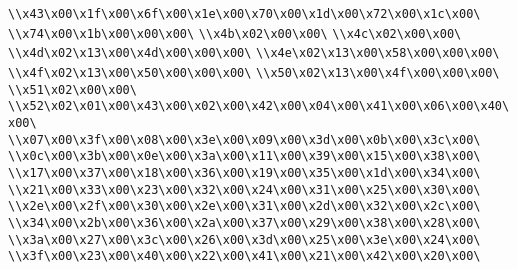 \verb|\\x43\x00\x1f\x00\x6f\x00\x1e\x00\x70\x00\x1d\x00\x72\x00\x1c\x00\|\newline
\verb|\\x74\x00\x1b\x00\x00\x00\|\newline
\verb|\\x4b\x02\x00\x00\|\newline
\verb|\\x4c\x02\x00\x00\|\newline
\verb|\\x4d\x02\x13\x00\x4d\x00\x00\x00\|\newline
\verb|\\x4e\x02\x13\x00\x58\x00\x00\x00\|\newline
\verb|\\x4f\x02\x13\x00\x50\x00\x00\x00\|\newline
\verb|\\x50\x02\x13\x00\x4f\x00\x00\x00\|\newline
\verb|\\x51\x02\x00\x00\|\newline
\verb|\\x52\x02\x01\x00\x43\x00\x02\x00\x42\x00\x04\x00\x41\x00\x06\x00\x40\x00\|\newline
\verb|\\x07\x00\x3f\x00\x08\x00\x3e\x00\x09\x00\x3d\x00\x0b\x00\x3c\x00\|\newline
\verb|\\x0c\x00\x3b\x00\x0e\x00\x3a\x00\x11\x00\x39\x00\x15\x00\x38\x00\|\newline
\verb|\\x17\x00\x37\x00\x18\x00\x36\x00\x19\x00\x35\x00\x1d\x00\x34\x00\|\newline
\verb|\\x21\x00\x33\x00\x23\x00\x32\x00\x24\x00\x31\x00\x25\x00\x30\x00\|\newline
\verb|\\x2e\x00\x2f\x00\x30\x00\x2e\x00\x31\x00\x2d\x00\x32\x00\x2c\x00\|\newline
\verb|\\x34\x00\x2b\x00\x36\x00\x2a\x00\x37\x00\x29\x00\x38\x00\x28\x00\|\newline
\verb|\\x3a\x00\x27\x00\x3c\x00\x26\x00\x3d\x00\x25\x00\x3e\x00\x24\x00\|\newline
\verb|\\x3f\x00\x23\x00\x40\x00\x22\x00\x41\x00\x21\x00\x42\x00\x20\x00\|\newline
